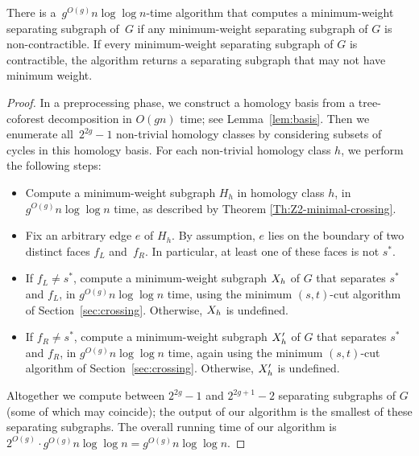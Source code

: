 \documentclass[letterpaper,review]{siamart190516}
\def\rnote#1{\color{red}Review: #1 \color{black}}
\def\knote#1{\textcolor{olive}{Kyle: #1}}
\begin{document}
{\begin{lemma}
\label{lem:global_split-alg}
There is a~$g^{O(g)} n \log \log n$-time algorithm that computes a minimum-weight separating subgraph of~$G$ if any minimum-weight separating subgraph of $G$ is non-contractible.  If every minimum-weight separating subgraph of $G$ is contractible, the algorithm returns a separating subgraph that may not have minimum weight.
\end{lemma}

\begin{proof}
In a preprocessing phase, we construct a homology basis from a tree-coforest decomposition in
$O(gn)$ time; see Lemma~\ref{lem:basis}.
Then we enumerate all~$2^{2g}-1$ non-trivial homology classes by considering subsets of cycles in this homology basis.  For each non-trivial homology class $h$, we perform the following steps:
\begin{itemize}
\item
Compute a minimum-weight subgraph $H_h$ in homology class $h$, in $g^{O(g)}n\log\log n$ time, as described by Theorem \ref{Th:Z2-minimal-crossing}.
\item
Fix an arbitrary edge $e$ of $H_h$.  By assumption, $e$ lies on the boundary of two distinct faces
$f_L$ and~$f_R$.  In particular, at least one of these faces is not $s^*$.
\item
If $f_L\ne s^*$, compute a minimum-weight subgraph $X_h$ of $G$ that separates $s^*$ and $f_L$, in $g^{O(g)}n\log\log n$ time, using the minimum $(s,t)$-cut algorithm of Section~\ref{sec:crossing}.  Otherwise, $X_h$ is undefined.
\item
If $f_R\ne s^*$, compute a minimum-weight subgraph $X'_h$ of $G$ that separates $s^*$ and $f_R$, in $g^{O(g)}n\log\log n$ time, again using the minimum $(s,t)$-cut algorithm of Section~\ref{sec:crossing}.  Otherwise, $X'_h$ is undefined.
\end{itemize}
Altogether we compute between $2^{2g}-1$ and $2^{2g+1}-2$ separating subgraphs of $G$ (some of which may coincide); the output of our algorithm is the smallest of these separating subgraphs.  The overall running time of our algorithm is $2^{O(g)} \cdot g^{O(g)}n\log\log n = g^{O(g)}n\log\log n$.


\end{proof}}
\end{document}
